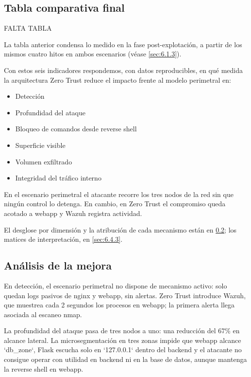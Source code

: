 \documentclass[11pt,spanish,listoffigures,listoftables]{tfgetsinf}
\begin{document}
        \subsection{Tabla comparativa final}
        FALTA TABLA

        La tabla anterior condensa lo medido en la fase post-explotación, a partir de los mismos cuatro hitos en ambos escenarios (véase \cref{sec:6.1.3}). 

        Con estos seis indicadores respondemos, con datos reproducibles, en qué medida la arquitectura Zero Trust reduce el impacto frente al modelo perimetral en:
        \begin{itemize}
            \item Detección
            \item Profundidad del ataque
            \item Bloqueo de comandos desde reverse shell
            \item Superficie visible
            \item Volumen exfiltrado
            \item Integridad del tráfico interno
        \end{itemize}
        
        En el escenario perimetral el atacante recorre los tres nodos de la red sin que ningún control lo detenga. En cambio, en Zero Trust el compromiso queda acotado a webapp y Wazuh registra actividad. 
        
        El desglose por dimensión y la atribución de cada mecanismo están en \cref{sec:6.4.2}; los matices de interpretación, en \cref{sec:6.4.3}.
        
        \subsection{Análisis de la mejora}
        \label{sec:6.4.2}

        En detección, el escenario perimetral no dispone de mecanismo activo: solo quedan logs pasivos de nginx y webapp, sin alertas. Zero Trust introduce Wazuh, que muestrea cada 2 segundos los procesos en webapp; la primera alerta llega asociada al escaneo nmap.

        La profundidad del ataque pasa de tres nodos a uno: una reducción del 67\% en alcance lateral. La microsegmentación en tres zonas impide que webapp alcance `db\_zone`, Flask escucha solo en `127.0.0.1` dentro del backend y el atacante no consigue operar con utilidad en backend ni en la base de datos, aunque mantenga la reverse shell en webapp.
        
\end{document}
